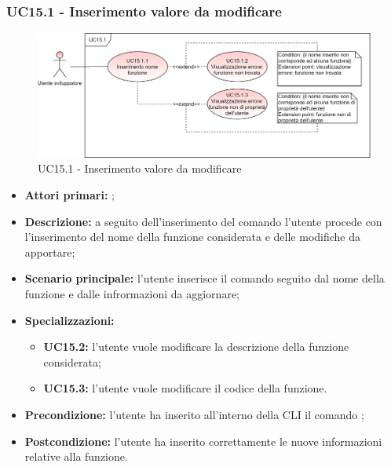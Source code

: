 \subsubsection{UC15.1 - Inserimento valore da modificare}
\begin{figure}[H]
	\centering
	\includegraphics[scale=\ucs]{./res/img/UC15-1.png}
	\caption {UC15.1 - Inserimento valore da modificare}
\end{figure}
\begin{itemize}
	\item \textbf{Attori primari:} \us{};
	\item \textbf{Descrizione:} a seguito dell'inserimento del comando \edit{} l’utente procede con l’inserimento del nome della funzione considerata e delle modifiche da apportare; 
	\item \textbf{Scenario principale:} l'utente inserisce il comando \edit{} seguito dal nome della funzione e dalle infrormazioni da aggiornare; 
	\item \textbf{Specializzazioni:} 
	\begin{itemize}
		\item \textbf{UC15.2:} l’utente vuole modificare la descrizione della funzione considerata; 
		\item \textbf{UC15.3:} l’utente vuole modificare il codice della funzione. 
	\end{itemize}
	\item \textbf{Precondizione:} l’utente ha inserito all’interno della CLI il comando \edit{}; 
	\item \textbf{Postcondizione:} l’utente ha inserito correttamente le nuove informazioni relative alla funzione.
\end{itemize}